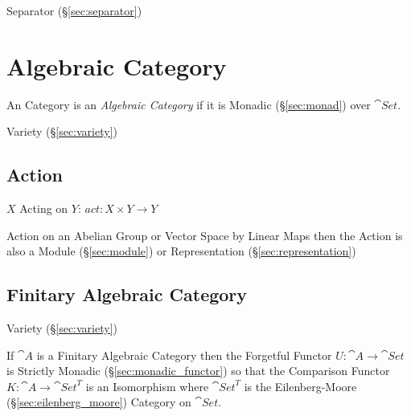 Separator (\S\ref{sec:separator})



\section{Algebraic Category}\label{sec:algebraic_category}

An Category is an \emph{Algebraic Category} if it is Monadic
(\S\ref{sec:monad}) over $\cat{Set}$.

Variety (\S\ref{sec:variety})



\subsection{Action}\label{sec:action}


$X$ Acting on $Y$: $act: X \times Y \rightarrow Y$

Action on an Abelian Group or Vector Space by Linear Maps then the
Action is also a Module (\S\ref{sec:module}) or Representation
(\S\ref{sec:representation})



\subsection{Finitary Algebraic Category}
\label{sec:finitary_algebraic_category}

Variety (\S\ref{sec:variety})

If $\cat{A}$ is a Finitary Algebraic Category then the Forgetful
Functor $U : \cat{A} \rightarrow \cat{Set}$ is Strictly Monadic
(\S\ref{sec:monadic_functor}) so that the Comparison Functor $K :
\cat{A} \rightarrow \cat{Set}^T$ is an Isomorphism where
$\cat{Set}^T$ is the Eilenberg-Moore (\S\ref{sec:eilenberg_moore})
Category on $\cat{Set}$.




